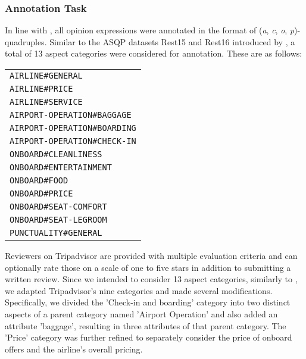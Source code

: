 \subsubsection{Annotation Task}

In line with \citet{zhang2021aspect}, all opinion expressions were annotated in the format of (\textit{a}, \textit{c}, \textit{o}, \textit{p})-quadruples. Similar to the ASQP datasets Rest15 and Rest16 introduced by \citet{zhang2021aspect}, a total of 13 aspect categories were considered for annotation. These are as follows:


\vspace{0.5cm}
\hspace*{-0.5cm}
\begin{tabular}{l}
\texttt{AIRLINE\#GENERAL}  \\
\texttt{AIRLINE\#PRICE}  \\
\texttt{AIRLINE\#SERVICE}  \\
\texttt{AIRPORT-OPERATION\#BAGGAGE}   \\
\texttt{AIRPORT-OPERATION\#BOARDING}   \\
\texttt{AIRPORT-OPERATION\#CHECK-IN}  \\
\texttt{ONBOARD\#CLEANLINESS}  \\
\texttt{ONBOARD\#ENTERTAINMENT}  \\
\texttt{ONBOARD\#FOOD}  \\
\texttt{ONBOARD\#PRICE}  \\
\texttt{ONBOARD\#SEAT-COMFORT}  \\
\texttt{ONBOARD\#SEAT-LEGROOM}  \\
\texttt{PUNCTUALITY\#GENERAL}   \\


\end{tabular}
\vspace{0.5cm}

Reviewers on Tripadvisor are provided with multiple evaluation criteria and can optionally rate those on a scale of one to five stars in addition to submitting a written review. Since we intended to consider 13 aspect categories, similarly to \citet{zhang2021aspect}, we adapted Tripadvisor's nine categories and made several modifications. Specifically, we divided the 'Check-in and boarding' category into two distinct aspects of a parent category named 'Airport Operation' and also added an attribute 'baggage', resulting in three attributes of that parent category. The 'Price' category was further refined to separately consider the price of onboard offers and the airline's overall pricing.

